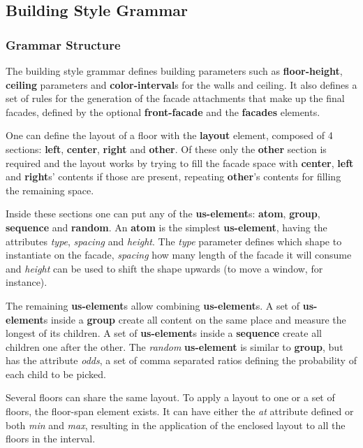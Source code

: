 \subsection{Building Style Grammar}

\subsubsection{Grammar Structure}

The building style grammar defines building parameters such as
\textbf{floor-height}, \textbf{ceiling} parameters and \textbf{color-interval}s for the walls and ceiling.
It also defines a set of rules for the generation of the facade attachments that make up the final facades,
defined by the optional \textbf{front-facade} and the \textbf{facades} elements.

One can define the layout of a floor with the \textbf{layout} element, composed of 4 sections:
\textbf{left}, \textbf{center}, \textbf{right} and \textbf{other}.
Of these only the \textbf{other} section is required and the layout works by trying to fill the facade space with \textbf{center}, \textbf{left} and \textbf{right}s' contents if those are present, repeating \textbf{other}'s contents for filling the remaining space.

Inside these sections one can put any of the \textbf{us-element}s: \textbf{atom}, \textbf{group}, \textbf{sequence} and \textbf{random}.
An \textbf{atom} is the simplest \textbf{us-element}, having the attributes
\emph{type}, \emph{spacing} and \emph{height}.
The \emph{type} parameter defines which shape to instantiate on the facade,
\emph{spacing} how many length of the facade it will consume and
\emph{height} can be used to shift the shape upwards (to move a window, for instance).

The remaining \textbf{us-element}s allow combining \textbf{us-element}s.
A set of \textbf{us-element}s inside a \textbf{group} create all content on the same place and measure the longest of its children.
A set of \textbf{us-element}s inside a \textbf{sequence} create all children one after the other.
The \emph{random} \textbf{us-element} is similar to \textbf{group}, but has the attribute \emph{odds},
a set of comma separated ratios defining the probability of each child to be picked.

Several floors can share the same layout. To apply a layout to one or a set of floors, the floor-span element exists.
It can have either the \emph{at} attribute defined or both \emph{min} and \emph{max},
resulting in the application of the enclosed layout to all the floors in the interval.

